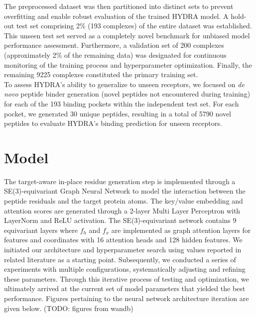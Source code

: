 The preprocessed dataset was then partitioned into distinct sets to prevent overfitting and enable robust evaluation of the trained HYDRA model. A hold-out test set comprising 2\% (193 complexes) of the entire dataset was established. This unseen test set served as a completely novel benchmark for unbiased model performance assessment. Furthermore, a validation set of 200 complexes (approximately 2\% of the remaining data) was designated for continuous monitoring of the training process and hyperparameter optimization. Finally, the remaining 9225 complexes constituted the primary training set. \\

To assess HYDRA's ability to generalize to unseen receptors, we focused on \textit{de novo} peptide binder generation (novel peptides not encountered during training) for each of the 193 binding pockets within the independent test set. For each pocket, we generated 30 unique peptides, resulting in a total of 5790 novel peptides to evaluate HYDRA's binding prediction for unseen receptors.

\section{Model}
The target-aware in-place residue generation step is implemented through a SE(3)-equivariant Graph Neural Network to model the interaction between the peptide residuals and the target protein atoms. The key/value embedding and attention scores are generated through a 2-layer Multi Layer Perceptron with LayerNorm and ReLU activation.
The SE(3)-equivariant network contains 9 equivariant layers where $f_h$ and $f_x$ are implemented as graph attention layers for features and coordinates with 16 attention heads and 128 hidden features. We initiated our architecture and hyperparameter search using values reported in related literature \cite{guan20233d} as a starting point. Subsequently, we conducted a series of experiments with multiple configurations, systematically adjusting and refining these parameters. Through this iterative process of testing and optimization, we ultimately arrived at the current set of model parameters that yielded the best performance. Figures pertaining to the neural network architecture iteration are given below. (TODO: figures from wandb) \\

